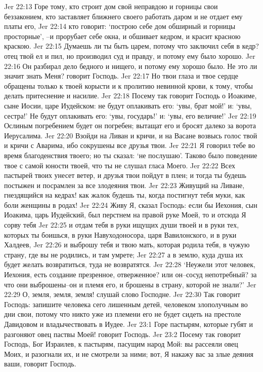 Jer 22:13  Горе тому, кто строит дом свой неправдою и горницы свои беззаконием, кто заставляет ближнего своего работать даром и не отдает ему платы его,
Jer 22:14  кто говорит: `построю себе дом обширный и горницы просторные', --и прорубает себе окна, и обшивает кедром, и красит красною краскою.
Jer 22:15  Думаешь ли ты быть царем, потому что заключил себя в кедр? отец твой ел и пил, но производил суд и правду, и потому ему было хорошо.
Jer 22:16  Он разбирал дело бедного и нищего, и потому ему хорошо было. Не это ли значит знать Меня? говорит Господь.
Jer 22:17  Но твои глаза и твое сердце обращены только к твоей корысти и к пролитию невинной крови, к тому, чтобы делать притеснение и насилие.
Jer 22:18  Посему так говорит Господь о Иоакиме, сыне Иосии, царе Иудейском: не будут оплакивать его: `увы, брат мой!' и: `увы, сестра!' Не будут оплакивать его: `увы, государь!' и: `увы, его величие!'
Jer 22:19  Ослиным погребением будет он погребен; вытащат его и бросят далеко за ворота Иерусалима.
Jer 22:20  Взойди на Ливан и кричи, и на Васане возвысь голос твой и кричи с Аварима, ибо сокрушены все друзья твои.
Jer 22:21  Я говорил тебе во время благоденствия твоего; но ты сказал: `не послушаю'. Таково было поведение твое с самой юности твоей, что ты не слушал гласа Моего.
Jer 22:22  Всех пастырей твоих унесет ветер, и друзья твои пойдут в плен; и тогда ты будешь постыжен и посрамлен за все злодеяния твои.
Jer 22:23  Живущий на Ливане, гнездящийся на кедрах! как жалок будешь ты, когда постигнут тебя муки, как боли женщины в родах!
Jer 22:24  Живу Я, сказал Господь: если бы Иехония, сын Иоакима, царь Иудейский, был перстнем на правой руке Моей, то и отсюда Я сорву тебя
Jer 22:25  и отдам тебя в руки ищущих души твоей и в руки тех, которых ты боишься, в руки Навуходоносора, царя Вавилонского, и в руки Халдеев,
Jer 22:26  и выброшу тебя и твою мать, которая родила тебя, в чужую страну, где вы не родились, и там умрете;
Jer 22:27  а в землю, куда душа их будет желать возвратиться, туда не возвратятся.
Jer 22:28  `Неужели этот человек, Иехония, есть создание презренное, отверженное? или он--сосуд непотребный? за что они выброшены--он и племя его, и брошены в страну, которой не знали?'
Jer 22:29  О, земля, земля, земля! слушай слово Господне.
Jer 22:30  Так говорит Господь: запишите человека сего лишенным детей, человеком злополучным во дни свои, потому что никто уже из племени его не будет сидеть на престоле Давидовом и владычествовать в Иудее.
Jer 23:1  Горе пастырям, которые губят и разгоняют овец паствы Моей! говорит Господь.
Jer 23:2  Посему так говорит Господь, Бог Израилев, к пастырям, пасущим народ Мой: вы рассеяли овец Моих, и разогнали их, и не смотрели за ними; вот, Я накажу вас за злые деяния ваши, говорит Господь.
